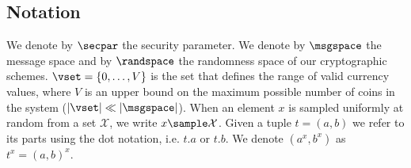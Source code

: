 \subsection{Notation}
We denote by $\secpar$ the security parameter. 
We denote by $\msgspace$ the message space and by $\randspace$ the randomness space of our cryptographic schemes.
$\vset = \{0,\dots,V\}$ is the set that defines the range of valid currency values, where $V$ is an upper bound on the maximum possible number of coins in the system ($|\vset| \ll |\msgspace|$). 
When an element $x$ is sampled uniformly at random from a set $\mathcal{X}$, we write $x \sample \mathcal{X}$.
Given a tuple $t = (a,b)$ we refer to its parts using the dot notation, i.e. $t.a$ or $t.b$.
We  denote $(a^x,b^x)$ as $t^x = (a,b)^x$.


